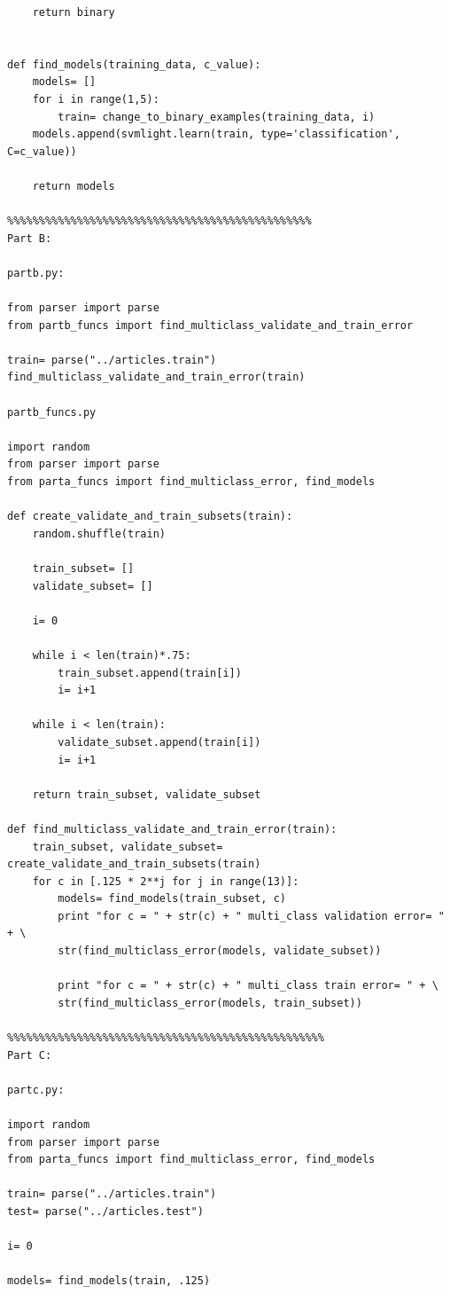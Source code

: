 \documentclass[12pt]{article}
\begin{document}
\begin{lstlisting}
    return binary


def find_models(training_data, c_value):
    models= []
    for i in range(1,5):
        train= change_to_binary_examples(training_data, i)
	models.append(svmlight.learn(train, type='classification', C=c_value))

    return models

%%%%%%%%%%%%%%%%%%%%%%%%%%%%%%%%%%%%%%%%%%%%%%%%
Part B:

partb.py:

from parser import parse
from partb_funcs import find_multiclass_validate_and_train_error

train= parse("../articles.train")
find_multiclass_validate_and_train_error(train)

partb_funcs.py

import random
from parser import parse
from parta_funcs import find_multiclass_error, find_models

def create_validate_and_train_subsets(train):
    random.shuffle(train)

    train_subset= []
    validate_subset= []

    i= 0

    while i < len(train)*.75:
        train_subset.append(train[i])
        i= i+1

    while i < len(train):
        validate_subset.append(train[i])
        i= i+1

    return train_subset, validate_subset

def find_multiclass_validate_and_train_error(train):
    train_subset, validate_subset= create_validate_and_train_subsets(train)
    for c in [.125 * 2**j for j in range(13)]:
        models= find_models(train_subset, c)
        print "for c = " + str(c) + " multi_class validation error= " + \
        str(find_multiclass_error(models, validate_subset))

        print "for c = " + str(c) + " multi_class train error= " + \
        str(find_multiclass_error(models, train_subset))

%%%%%%%%%%%%%%%%%%%%%%%%%%%%%%%%%%%%%%%%%%%%%%%%%%
Part C:

partc.py:

import random
from parser import parse
from parta_funcs import find_multiclass_error, find_models

train= parse("../articles.train")
test= parse("../articles.test")

i= 0

models= find_models(train, .125)


\end{lstlisting}
\end{document}
